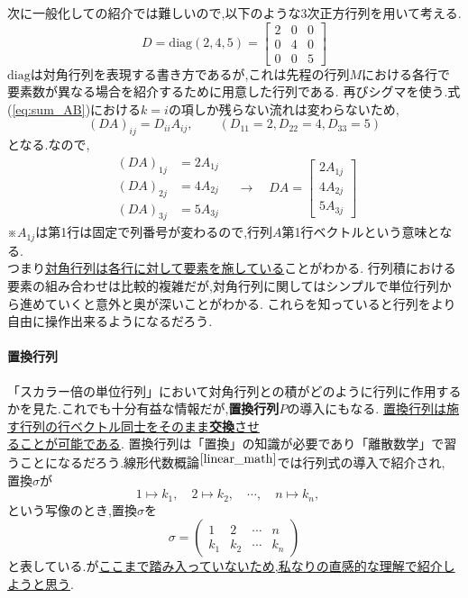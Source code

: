 次に一般化しての紹介では難しいので,以下のような3次正方行列を用いて考える.
\[
    D = \mathrm{diag}(2,4,5) = \begin{bmatrix}
        2 & 0 & 0 \\ 0 & 4 & 0 \\ 0 & 0 & 5
    \end{bmatrix}
\]
$\mathrm{diag}$は対角行列を表現する書き方であるが,これは先程の行列$M$における各行で要素数が異なる場合を紹介するために用意した行列である.
再びシグマを使う.式(\ref{eq:sum_AB})における$k=i$の項しか残らない流れは変わらないため,
\[
    (DA)_{ij}=D_{ii}A_{ij},\qquad(D_{11}=2,D_{22}=4,D_{33}=5)
\]
となる.なので,
\[
\begin{aligned}
    (DA)_{1j} &= 2A_{1j}\\
    (DA)_{2j} &= 4A_{2j}\\
    (DA)_{3j} &= 5A_{3j}
\end{aligned}
\quad \longrightarrow \quad 
DA = \begin{bmatrix}
    2A_{1j} \\ 4A_{2j} \\ 5A_{3j}
\end{bmatrix}
\]
※$A_{1j}$は第1行は固定で列番号が変わるので,行列$A$第1行ベクトルという意味となる.\medskip\\
つまり\underline{対角行列は各行に対して要素を施している}ことがわかる.
行列積における要素の組み合わせは比較的複雑だが,対角行列に関してはシンプルで単位行列から進めていくと意外と奥が深いことがわかる.
これらを知っていると行列をより自由に操作出来るようになるだろう.
\paragraph{置換行列}
「スカラー倍の単位行列」において対角行列との積がどのように行列に作用するかを見た.これでも十分有益な情報だが,\textbf{置換行列$P$}の導入にもなる.
\underline{置換行列は施す行列の行ベクトル同士をそのまま\textbf{交換}させ}\\\underline{ることが可能である}.
置換行列は「置換」の知識が必要であり「離散数学」で習うことになるだろう.線形代数概論$^{\cite{linear_math}}$では行列式の導入で紹介され,
置換$\sigma$が
\[
1 \mapsto k_1,\quad
2 \mapsto k_2,\quad
\cdots,\quad
n \mapsto k_n,\quad
\]
という写像のとき,置換$\sigma$を
\[
    \sigma = \begin{pmatrix}
        1 & 2 & \cdots & n \\ k_1 & k_2 & \cdots & k_n
    \end{pmatrix}
\]
と表している.が\underline{ここまで踏み入っていないため,私なりの直感的な理解で紹介しようと思う}.


